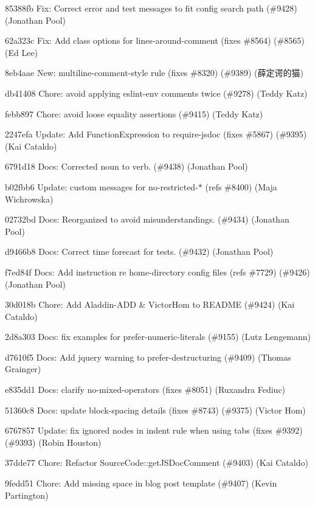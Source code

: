 \begin{DoxyItemize}
\item 85388fb Fix\+: Correct error and test messages to fit config search path (\#9428) (Jonathan Pool)
\item 62a323c Fix\+: Add class options for {\ttfamily lines-\/around-\/comment} (fixes \#8564) (\#8565) (Ed Lee)
\item 8eb4aae New\+: multiline-\/comment-\/style rule (fixes \#8320) (\#9389) (薛定谔的猫)
\item db41408 Chore\+: avoid applying eslint-\/env comments twice (\#9278) (Teddy Katz)
\item febb897 Chore\+: avoid loose equality assertions (\#9415) (Teddy Katz)
\item 2247efa Update\+: Add Function\+Expression to require-\/jsdoc (fixes \#5867) (\#9395) (Kai Cataldo)
\item 6791d18 Docs\+: Corrected noun to verb. (\#9438) (Jonathan Pool)
\item b02fbb6 Update\+: custom messages for no-\/restricted-\/\texorpdfstring{$\ast$}{*} (refs \#8400) (Maja Wichrowska)
\item 02732bd Docs\+: Reorganized to avoid misunderstandings. (\#9434) (Jonathan Pool)
\item d9466b8 Docs\+: Correct time forecast for tests. (\#9432) (Jonathan Pool)
\item f7ed84f Docs\+: Add instruction re home-\/directory config files (refs \#7729) (\#9426) (Jonathan Pool)
\item 30d018b Chore\+: Add Aladdin-\/\+ADD \& Victor\+Hom to README (\#9424) (Kai Cataldo)
\item 2d8a303 Docs\+: fix examples for prefer-\/numeric-\/literals (\#9155) (Lutz Lengemann)
\item d7610f5 Docs\+: Add jquery warning to prefer-\/destructuring (\#9409) (Thomas Grainger)
\item e835dd1 Docs\+: clarify no-\/mixed-\/operators (fixes \#8051) (Ruxandra Fediuc)
\item 51360c8 Docs\+: update block-\/spacing details (fixes \#8743) (\#9375) (Victor Hom)
\item 6767857 Update\+: fix ignored nodes in indent rule when using tabs (fixes \#9392) (\#9393) (Robin Houston)
\item 37dde77 Chore\+: Refactor Source\+Code\+::get\+JSDoc\+Comment (\#9403) (Kai Cataldo)
\item 9fedd51 Chore\+: Add missing space in blog post template (\#9407) (Kevin Partington)

\end{DoxyItemize}
